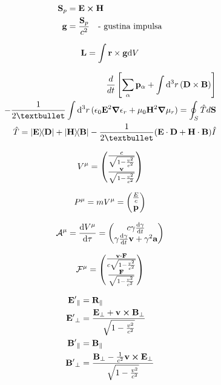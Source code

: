 \documentclass[11pt,twoside]{article}
\begin{document}
\begin{multicols}{3}
\begin{footnotesize}
\begin{equation}
\begin{split}
\vb{S}_p &= \vb{E}\cross\vb{H} \\
\vb{g} &= \frac{\vb{S}_p}{c^2} \quad \text{- gustina impulsa}
\end{split}
\end{equation}

\begin{equation}
\vb{L} = \int \vb{r} \times \vb{g} \dd V
\end{equation}

\begin{equation}
\begin{split}
\frac{d}{dt}\left[\sum_{\alpha} \vb{p}_{\alpha} + \int \dd[3]{r} (\vb{D} \times \vb{B}) \right] \\ - \frac{1}{2•}\int \dd[3]{r}(\epsilon_0 \vb{E}^2 \gradient \epsilon_r + \mu_0\vb{H}^2 \gradient \mu_r) = \oint_S \hat{T}d\vb{S} \\
\hat{T} = \dyad{\vb{E}}{\vb{D}} + \dyad{\vb{H}}{\vb{B}} - \frac{1}{2•}(\vb{E}\cdot\vb{D}+\vb{H}\cdot\vb{B})\hat{I}
\end{split}
\end{equation}

\begin{equation}
V^{\mu} = \mqty(\frac{c}{\sqrt{1-\frac{v^2}{c^2}}}\\\frac{\vb{v}}{\sqrt{1-\frac{v^2}{c^2}}})
\end{equation}

\begin{equation}
P^{\mu} = mV^{\mu} = \mqty(\frac{E}{c}\\\vb{p})
\end{equation}

\begin{equation}
\mathcal{A}^\mu = \dv{V^{\mu}}{\tau} = \mqty(c\gamma\dv{\gamma}{t}\\\gamma\dv{\gamma}{t}\vb{v}+\gamma^2\vb{a})
\end{equation}

\begin{equation}
\mathcal{F}^\mu = \mqty(\frac{\vb{v}\vdot\vb{F}}{c\sqrt{1-\frac{v^2}{c^2}}}\\\frac{\vb{F}}{\sqrt{1-\frac{v^2}{c^2}}})
\end{equation}

\begin{equation}
\begin{split}
\vb{E'}_{\parallel} &= \vb{R}_{\parallel} \\
\vb{E'}_{\perp} &= \frac{\vb{E}_{\perp}+\vb{v}\cross\vb{B}_{\perp}}{\sqrt{1-\frac{v^2}{c^2}}} \\
\vb{B'}_{\parallel} &= \vb{B}_{\parallel} \\
\vb{B'}_{\perp} &= \frac{\vb{B}_{\perp} - \frac{1}{c^2}\vb{v}\cross\vb{E}_{\perp}}{\sqrt{1-\frac{v^2}{c^2}}}
\end{split}
\end{equation}


\end{footnotesize}
\end{multicols}
\end{document}
